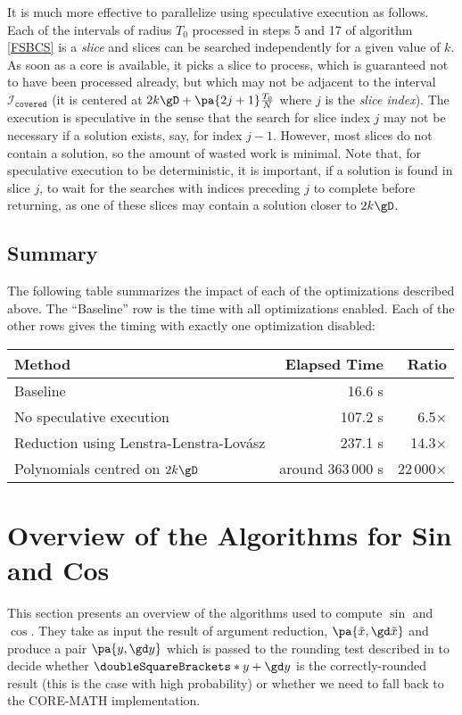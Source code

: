 \documentclass[10pt, a4paper, twoside]{basestyle}
\newcommand{\round}[1]{\doubleSquareBrackets*{#1}}
\newcommand{\red}[1]{\tilde{#1}}
\begin{document}
It is much more effective to parallelize using speculative execution as follows.  Each of the intervals of radius $T_0$ processed in steps 5 and 17 of algorithm \ref{FSBCS} is a \emph{slice} and slices can be searched independently for a given value of $k$.  As soon as a core is available, it picks a slice to process, which is guaranteed not to have been processed already, but which may not be adjacent to the interval $\mathscr{I}_{\texttt{covered}}$ (it is centered at $2 k \gD + \pa{2 j + 1} \frac{T_0}{N}$ where $j$ is the \emph{slice index}).  The execution is speculative in the sense that the search for slice index $j$ may not be necessary if a solution exists, say, for index $j - 1$.  However, most slices do not contain a solution, so the amount of wasted work is minimal.  Note that, for speculative execution to be deterministic, it is important, if a solution is found in slice $j$, to wait for the searches with indices preceding $j$ to complete before returning, as one of these slices may contain a solution closer to $2 k \gD$.

\subsection*{Summary}

The following table summarizes the impact of each of the optimizations described above.  The ``Baseline'' row is the time with all optimizations enabled.  Each of the other rows gives the timing with exactly one optimization disabled:
\begin{center}
\begin{tabular}{lrr}
Method & Elapsed Time & Ratio \\
\hline
Baseline & 16.6 s &  \\
No speculative execution & 107.2 s & 6.5× \\
Reduction using Lenstra-Lenstra-Lovász & 237.1 s & 14.3× \\
Polynomials centred on $2 k \gD$ & around 363\,000 s & 22\,000×
\end{tabular}
\end{center}

\section*{Overview of the Algorithms for Sin and Cos}\label{overview}

This section presents an overview of the algorithms used to compute $\sin$ and $\cos$.  They take as input the result of argument reduction, $\pa{\red x, \gd \red x}$ and produce a pair $\pa{y, \gd y}$ which is passed to the rounding test described in \cite[397]{MullerBrisebarreDeDinechinJeannerodLefevreMelquiondRevolStehleTorres2010} to decide whether $\round{y + \gd y}$ is the correctly-rounded result (this is the case with high probability) or whether we need to fall back to the CORE-MATH implementation.
\end{document}
